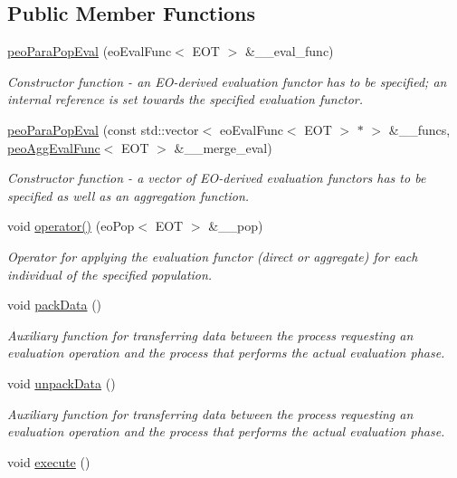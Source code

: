 \subsection*{Public Member Functions}
\begin{CompactItemize}
\item 
\hyperlink{classpeoParaPopEval_bcb540510a7038520bec41a7af332daf}{peo\-Para\-Pop\-Eval} (eo\-Eval\-Func$<$ EOT $>$ \&\_\-\_\-eval\_\-func)
\begin{CompactList}\small\item\em Constructor function - an EO-derived evaluation functor has to be specified; an internal reference is set towards the specified evaluation functor. \item\end{CompactList}\item 
\hyperlink{classpeoParaPopEval_1cc13a1ec366f95d219d682eccb455bc}{peo\-Para\-Pop\-Eval} (const std::vector$<$ eo\-Eval\-Func$<$ EOT $>$ $\ast$ $>$ \&\_\-\_\-funcs, \hyperlink{classpeoAggEvalFunc}{peo\-Agg\-Eval\-Func}$<$ EOT $>$ \&\_\-\_\-merge\_\-eval)
\begin{CompactList}\small\item\em Constructor function - a vector of EO-derived evaluation functors has to be specified as well as an aggregation function. \item\end{CompactList}\item 
void \hyperlink{classpeoParaPopEval_aeaa4fca4f8650e453e308838b4a2cb5}{operator()} (eo\-Pop$<$ EOT $>$ \&\_\-\_\-pop)
\begin{CompactList}\small\item\em Operator for applying the evaluation functor (direct or aggregate) for each individual of the specified population. \item\end{CompactList}\item 
void \hyperlink{classpeoParaPopEval_fea632bd645ab11182782fd3c038d6d8}{pack\-Data} ()
\begin{CompactList}\small\item\em Auxiliary function for transferring data between the process requesting an evaluation operation and the process that performs the actual evaluation phase. \item\end{CompactList}\item 
void \hyperlink{classpeoParaPopEval_410bf4c173e2f36df82251cb16ce1b05}{unpack\-Data} ()
\begin{CompactList}\small\item\em Auxiliary function for transferring data between the process requesting an evaluation operation and the process that performs the actual evaluation phase. \item\end{CompactList}\item 
\hypertarget{classpeoParaPopEval_3af76378611eac5a36da9a0a00aeeb6c}{
void \hyperlink{classpeoParaPopEval_3af76378611eac5a36da9a0a00aeeb6c}{execute} ()}
\label{classpeoParaPopEval_3af76378611eac5a36da9a0a00aeeb6c}


\end{CompactItemize}
